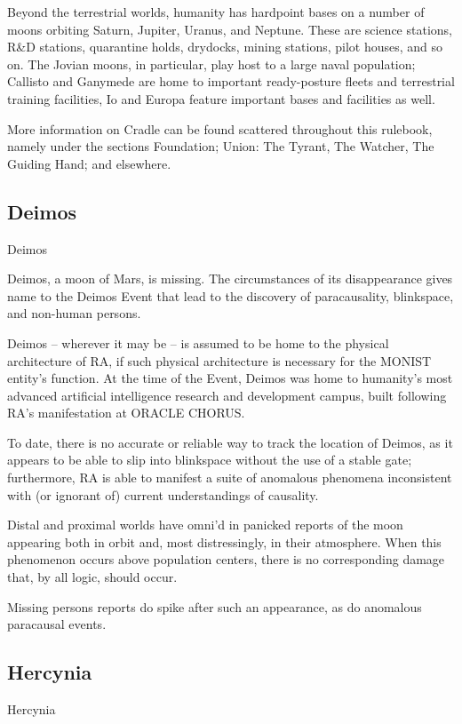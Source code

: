 Beyond the terrestrial worlds, humanity has hardpoint bases on a number of moons orbiting
Saturn, Jupiter, Uranus, and Neptune. These are science stations, R\&D stations, quarantine
holds, drydocks, mining stations, pilot houses, and so on. The Jovian moons, in particular, play
host to a large naval population; Callisto and Ganymede are home to important ready-posture
fleets and terrestrial training facilities, Io and Europa feature important bases and facilities as
well.


More information on Cradle can be found scattered throughout this rulebook, namely under the
sections Foundation; Union: The Tyrant, The Watcher, The Guiding Hand; and elsewhere.

\subsection{Deimos}
Deimos

Deimos, a moon of Mars, is missing. The circumstances of its disappearance gives name to the
Deimos Event that lead to the discovery of paracausality, blinkspace, and non-human persons.


Deimos -- wherever it may be -- is assumed to be home to the physical architecture of RA, if
such physical architecture is necessary for the MONIST entity’s function. At the time of the
Event, Deimos was home to humanity’s most advanced artificial intelligence research and
development campus, built following RA’s manifestation at ORACLE CHORUS.


To date, there is no accurate or reliable way to track the location of Deimos, as it appears to be
able to slip into blinkspace without the use of a stable gate; furthermore, RA is able to manifest a
suite of anomalous phenomena inconsistent with (or ignorant of) current understandings of
causality.


Distal and proximal worlds have omni’d in panicked reports of the moon appearing both in orbit
and, most distressingly, in their atmosphere. When this phenomenon occurs above population
centers, there is no corresponding damage that, by all logic, should occur.


Missing persons reports do spike after such an appearance, as do anomalous paracausal
events.




\subsection{Hercynia}
Hercynia

